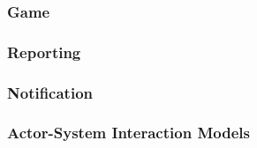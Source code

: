 \documentclass{article}
\begin{document}
    	\subsubsection{Game}
    	
    	\subsubsection{Reporting}
    	
    	\subsubsection{Notification}
    	
        
        \subsubsection{Actor-System Interaction Models}	
\end{document}
